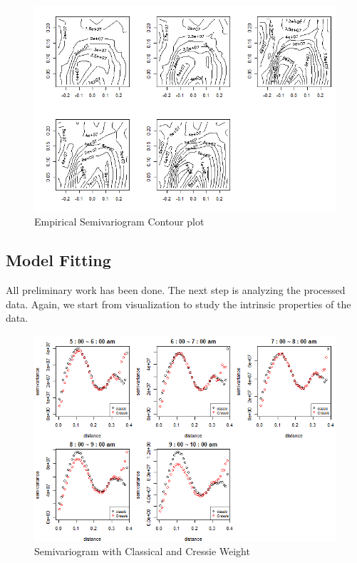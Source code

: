 \documentclass[hidelinks,12pt]{article}
\begin{document}
	\begin{figure}[!ht]
		\includegraphics[width=\textwidth,height=0.4\textheight]{esc.png}
		\caption{Empirical Semivariogram Contour plot\label{fig:esc}}
	\end{figure}
	\FloatBarrier
	

	\subsection{Model Fitting} \label{sec:resfit}
	All preliminary work has been done. The next step is analyzing the processed data. Again, we start from visualization to study the intrinsic properties of the data.
	\begin{figure}[!ht]
		\includegraphics[width=\textwidth,height=0.35\textheight]{semi.png}
		\caption{Semivariogram with Classical and Cressie Weight \label{fig:semi}}
	\end{figure}\\
\FloatBarrier
\end{document}

